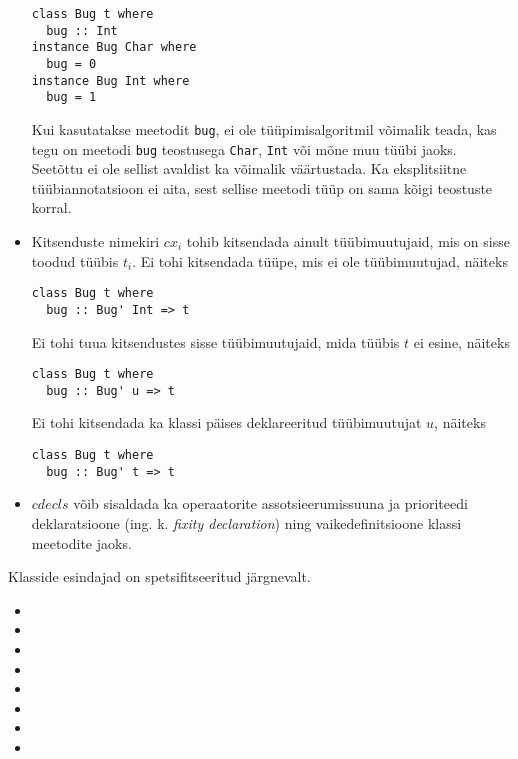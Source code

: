 \documentclass[12pt]{article}
\begin{document}
\begin{itemize}
          \begin{verbatim}class Bug t where
  bug :: Int
instance Bug Char where
  bug = 0
instance Bug Int where
  bug = 1\end{verbatim}

          Kui kasutatakse meetodit \verb!bug!, ei ole tüüpimisalgoritmil võimalik teada, kas tegu on meetodi \verb!bug! teostusega \verb!Char!, \verb!Int! või mõne muu tüübi jaoks. Seetõttu ei ole sellist avaldist ka võimalik väärtustada. Ka eksplitsiitne tüübiannotatsioon ei aita, sest sellise meetodi tüüp on sama kõigi teostuste korral.
        \item
          Kitsenduste nimekiri $cx_i$ tohib kitsendada ainult tüübimuutujaid, mis on sisse toodud tüübis $t_i$. Ei tohi kitsendada tüüpe, mis ei ole tüübimuutujad, näiteks

          \begin{verbatim}class Bug t where
  bug :: Bug' Int => t\end{verbatim}

          Ei tohi tuua kitsendustes sisse tüübimuutujaid, mida tüübis $t$ ei esine, näiteks

          \begin{verbatim}class Bug t where
  bug :: Bug' u => t\end{verbatim}

          Ei tohi kitsendada ka klassi päises deklareeritud tüübimuutujat $u$, näiteks

          \begin{verbatim}class Bug t where
  bug :: Bug' t => t\end{verbatim}
        \item
          $cdecls$ võib sisaldada ka operaatorite assotsieerumissuuna ja prioriteedi deklaratsioone (ing. k. \textit{fixity declaration}) ning vaikedefinitsioone klassi meetodite jaoks.
      \end{itemize}

      Klasside esindajad on spetsifitseeritud järgnevalt.

      \begin{itemize}
        \item
          
        \item
          
        \item
          
        \item
          
        \item
          
        \item
          
        \item
          
        \item
          
      \end{itemize}
\end{document}
